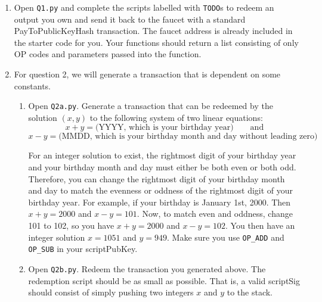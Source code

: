 \documentclass[11pt]{article}
\newenvironment{problems}
{\begin{enumerate}[label=\bfseries Exercise \arabic*.,align=left]}
{\end{enumerate}}
\begin{document}
\begin{problems}

\item
  Open \texttt{Q1.py} and complete the scripts labelled with \texttt{TODO}s
  to redeem an output you own and send it back to the faucet with a standard
  PayToPublicKeyHash transaction. The faucet address is already included in the starter code for you. Your functions should return a list consisting of only OP codes and parameters passed into the function.

\item For question 2, we will generate a transaction that is dependent on some constants.
    \begin{enumerate}
        \item Open \texttt{Q2a.py}. Generate a transaction that can be redeemed by the solution $(x,y)$ to the following system of two linear equations:
        \[
            x+y = \text{(YYYY, which is your birthday year)}  \qquad\text{and}
	\]
	\[
            x-y = \text{(MMDD, which is your birthday month and day without leading zero)}
        \]

	For an integer solution to exist, the rightmost digit of your birthday year and your birthday month and day must either be both even or both odd. Therefore, you can change the rightmost digit of your birthday month and day to match the evenness or oddness of the rightmost digit of your birthday year.
For example, if your birthday is January 1st, 2000. Then $x+y = 2000$ and $x - y = 101$. Now, to match even and oddness, change 101 to 102, so you have $x+y = 2000$ and $x-y = 102$. You then have an integer solution $x= 1051$ and $y= 949$.  Make sure you use \texttt{OP\_ADD} and \texttt{OP\_SUB} in your scriptPubKey.
        \item Open \texttt{Q2b.py}. Redeem the transaction you generated above. The redemption script should be as small as possible. That is, a valid scriptSig should consist of simply pushing two integers $x$ and $y$ to the stack.
    \end{enumerate}


\end{problems}
\end{document}

